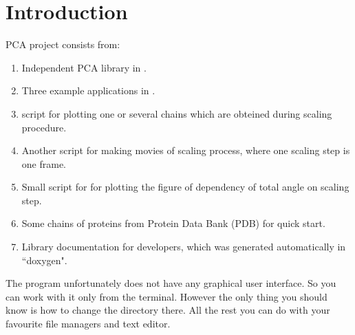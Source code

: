 \documentclass[12pt]{article}
\begin{document}
\thispagestyle{empty} %
\titleAT


\newpage
\tableofcontents
\newpage
\section*{Introduction} 
PCA project consists from:
\begin{enumerate}
\item Independent PCA library in .
\item Three example applications in .
\item {} script for plotting one or several chains which are obteined during scaling procedure.
\item Another  script for making movies of scaling process, where one scaling step is one frame.
\item Small script for  for plotting the figure of dependency of total angle on scaling step.
\item Some chains of proteins from Protein Data Bank (PDB) for quick start.
\item Library documentation for developers, which was generated automatically in ``doxygen".
\end{enumerate}
The program unfortunately does not have any graphical user interface. So you can work with it only from the terminal. However the only thing you should know is how to change the directory there. All the rest you can do with your favourite file managers and text editor.
\end{document}
